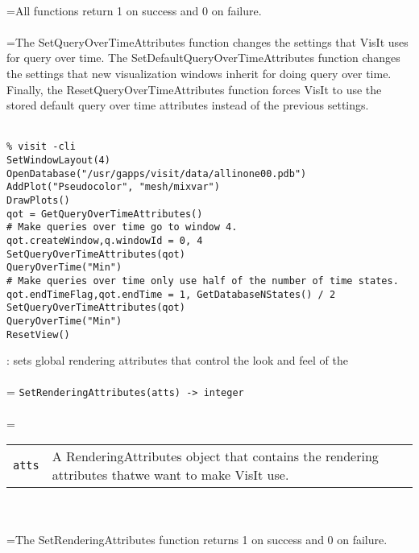 \documentclass[10pt,a4paper]{report}
\begin{document}
 \\ 
\hangindent=\parindent All functions return 1 on success and 0 on failure. \\[-3mm] 

 \\ 
\hangindent=\parindent The SetQueryOverTimeAttributes function changes the settings that VisIt uses for query over time. The SetDefaultQueryOverTimeAttributes function changes the settings that new visualization windows inherit for doing query over time. Finally, the ResetQueryOverTimeAttributes function forces VisIt to use the stored default query over time attributes instead of the previous settings. \\[-3mm] 

\\[-6mm]
\begin{verbatim}% visit -cli
SetWindowLayout(4)
OpenDatabase("/usr/gapps/visit/data/allinone00.pdb")
AddPlot("Pseudocolor", "mesh/mixvar")
DrawPlots()
qot = GetQueryOverTimeAttributes()
# Make queries over time go to window 4.
qot.createWindow,q.windowId = 0, 4
SetQueryOverTimeAttributes(qot)
QueryOverTime("Min")
# Make queries over time only use half of the number of time states.
qot.endTimeFlag,qot.endTime = 1, GetDatabaseNStates() / 2
SetQueryOverTimeAttributes(qot)
QueryOverTime("Min")
ResetView()
\end{verbatim}
\newpage


{}
: sets global rendering attributes that control the look and feel of the\\[-3mm]

 \\ 
\hangindent=\parindent 
\verb!SetRenderingAttributes(atts) -> integer!\\ [-3mm]

 \\ 
\hangindent=\parindent 
\begin{tabular}{lp{9cm}}
\verb!atts! & A RenderingAttributes object that contains the rendering attributes thatwe want to make VisIt use. \\
\end{tabular} \\[-2mm]


 \\ 
\hangindent=\parindent The SetRenderingAttributes function returns 1 on success and 0 on failure. \\[-3mm] 
\end{document}

